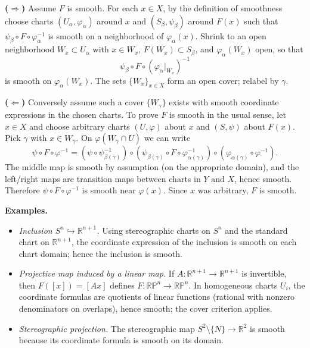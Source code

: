 \begin{solution}
\smallskip
\noindent\textbf{($\Rightarrow$)}
Assume $F$ is smooth. For each $x\in X$, by the definition of smoothness choose charts
$(U_\alpha,\varphi_\alpha)$ around $x$ and $(S_\beta,\psi_\beta)$ around $F(x)$ such that
$\psi_\beta\circ F\circ\varphi_\alpha^{-1}$ is smooth on a neighborhood of $\varphi_\alpha(x)$.
Shrink to an open neighborhood $W_x\subset U_\alpha$ with $x\in W_x$, $F(W_x)\subset S_\beta$,
and $\varphi_\alpha(W_x)$ open, so that
\[
\psi_\beta\circ F\circ(\varphi_\alpha\vert_{W_x})^{-1}
\]
is smooth on $\varphi_\alpha(W_x)$. The sets $\{W_x\}_{x\in X}$ form an open cover; relabel by $\gamma$.

\smallskip
\noindent\textbf{($\Leftarrow$)}
Conversely assume such a cover $\{W_\gamma\}$ exists with smooth coordinate expressions in the chosen charts.
To prove $F$ is smooth in the usual sense, let $x\in X$ and choose arbitrary charts $(U,\varphi)$ about $x$
and $(S,\psi)$ about $F(x)$. Pick $\gamma$ with $x\in W_\gamma$.
On $\varphi(W_\gamma\cap U)$ we can write
\[
\psi\circ F\circ\varphi^{-1}
=
(\psi\circ\psi_{\beta(\gamma)}^{-1})
\circ
(\psi_{\beta(\gamma)}\circ F\circ\varphi_{\alpha(\gamma)}^{-1})
\circ
(\varphi_{\alpha(\gamma)}\circ\varphi^{-1}).
\]
The middle map is smooth by assumption (on the appropriate domain),
and the left/right maps are transition maps between charts in $Y$ and $X$, hence smooth.
Therefore $\psi\circ F\circ\varphi^{-1}$ is smooth near $\varphi(x)$.
Since $x$ was arbitrary, $F$ is smooth.

\medskip
\noindent\textbf{Examples.}
\begin{itemize}
	\item \emph{Inclusion $S^n\hookrightarrow\mathbb R^{n+1}$.}
	Using stereographic charts on $S^n$ and the standard chart on $\mathbb R^{n+1}$,
	the coordinate expression of the inclusion is smooth on each chart domain; hence the inclusion is smooth.
	\item \emph{Projective map induced by a linear map.}
	If $A:\mathbb R^{n+1}\to\mathbb R^{n+1}$ is invertible, then $F([x])=[Ax]$ defines $F:\mathbb{RP}^n\to\mathbb{RP}^n$.
	In homogeneous charts $U_i$, the coordinate formulas are quotients of linear functions (rational with nonzero denominators on overlaps),
	hence smooth; the cover criterion applies.
	\item \emph{Stereographic projection.}
	The stereographic map $S^2\setminus\{N\}\to\mathbb R^2$ is smooth because its coordinate formula is smooth on its domain.
\end{itemize}



\end{solution}
